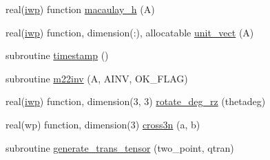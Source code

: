 \begin{DoxyCompactItemize}
\item 
real(\hyperlink{classlinearsolvers_ae428ee060e10bb0c2b1ce969c90536e1}{iwp}) function \hyperlink{classlinearsolvers_ae0443e1dfbe79ad2451a3407a19186f6}{macaulay\+\_\+h} (A)
\item 
real(\hyperlink{classlinearsolvers_ae428ee060e10bb0c2b1ce969c90536e1}{iwp}) function, dimension(\+:), allocatable \hyperlink{classlinearsolvers_a3db39edbd98fcd6e7c7a4ea4328e463f}{unit\+\_\+vect} (A)
\item 
subroutine \hyperlink{classlinearsolvers_a8d2f118c69cf1591bbed21272242798f}{timestamp} ()
\item 
subroutine \hyperlink{classlinearsolvers_a28d0eee248516491b351234e24cd357b}{m22inv} (A, A\+I\+N\+V, O\+K\+\_\+\+F\+L\+A\+G)
\item 
real(\hyperlink{classlinearsolvers_ae428ee060e10bb0c2b1ce969c90536e1}{iwp}) function, dimension(3, 3) \hyperlink{classlinearsolvers_a408047f18c66a8285ab127dd104c9c00}{rotate\+\_\+deg\+\_\+rz} (thetadeg)
\item 
real(wp) function, dimension(3) \hyperlink{classlinearsolvers_a747e41770a373c7c54e87abae0c1b3e6}{cross3n} (a, b)
\item 
subroutine \hyperlink{classlinearsolvers_a8e38f7ddc92d996c1e8b5942fa369847}{generate\+\_\+trans\+\_\+tensor} (two\+\_\+point, qtran)
\end{DoxyCompactItemize}
